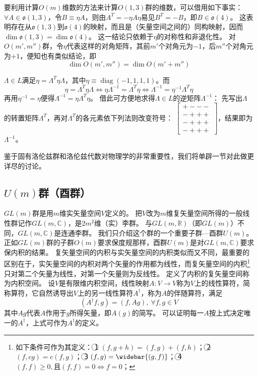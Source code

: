 要利用计算$O(m)$维数的方法来计算$O(1, 3)$群的维数，可以借用如下事实：
$\forall A \in \mathfrak{o}(1, 3)$，令$B \equiv \eta A$，则由$A^T = -\eta A \eta$易见$B^T = -B$，即$B \in \mathfrak{o}(4)$。
这表明存在从$\mathfrak{o}(1, 3)$到$\mathfrak{o}(4)$的映射，而且是（矢量空间之间的）同构映射，因而$\dim \mathfrak{o}(1, 3) = \dim \mathfrak{o}(4)$。
这一结论只依赖于$\eta$的对称性和非退化性。
对$O(m', m'')$群，令$\eta$代表这样的对角矩阵，其前$m'$个对角元为$-1$，后$m''$个对角元为$+1$，便知也有类似结论，即
$$\dim O(m', m'') = \dim O(m' + m'')$$

$\Lambda \in L$满足$\eta = \Lambda^T \eta \Lambda$，其中$\eta \equiv \operatorname{diag}(-1, 1, 1, 1)$。而
$$\eta = \Lambda^T \eta \Lambda \Leftrightarrow \eta \Lambda^{-1} = \Lambda^T \eta \Leftrightarrow \Lambda^{-1} = \eta^{-1}\Lambda^T\eta$$
再用$\eta^{-1} = \eta$便得$\Lambda^{-1} = \eta \Lambda^T \eta$。
借此可方便地求得$\Lambda \in L$的逆矩阵$\Lambda^{-1}$：
先写出$\Lambda$的转置矩阵$\Lambda^T$，再对$\Lambda^T$的各元素依下列法则改变符号：
$\begin{bmatrix}
    + - - - \\
    - + + + \\
    - + + + \\
    - + + +
\end{bmatrix}$，结果即为$\Lambda^{-1}$。

鉴于固有洛伦兹群和洛伦兹代数对物理学的非常重要性，我们将单辟一节对此做更详尽的讨论。

\subsection{$U(m)$群（酉群）}

$GL(m)$群是用$m$维实矢量空间$V$定义的。
把$V$改为$m$维复矢量空间所得的一般线性群记作$GL(m, \mathbb{C})$，是$2m^2$维（实）李群。
与$GL(m, \mathbb{R})$（即$GL(m)$）不同，$GL(m, \mathbb{C})$是连通李群。
我们只介绍这个群的一个重要子群---酉群$U(m)$。
正如$GL(m)$群的子群$O(m)$要求保度规那样，酉群$U(m)$是对$GL(m, \mathbb{C})$要求保内积的结果。
复矢量空间的内积与实矢量空间的内积类似而又不同，最重要的区别在于，实矢量空间的内积对两个矢量的作用都为线性，而复矢量空间的内积\footnote{
    如下条件可作为其定义：
    \textcircled{1} $(f, g + h) = (f, g) + (f, h)$；
    \textcircled{2} $(f, cg) = c(f, g)$；
    \textcircled{3} $(f, g) = \widebar{(g, f)}$；
    \textcircled{4} $(f, f) \geq 0, \text{且} (f, f) = 0 \Leftrightarrow f = 0$；
}只对第二个矢量为线性，对第一个矢量则为反线性。
定义了内积的复矢量空间称为内积空间。
设$V$是有限维内积空间，线性映射$A \colon V \to V$称为$V$上的线性算符，简称算符，它自然诱导出$V$上的另一线性算符$A^\dagger$，称为$A$的伴随算符，满足
$$(A^\dagger f, g) = (f, Ag), ~ \forall f, g \in V$$
其中$Ag$代表$A$作用于$g$所得矢量，即$A(g)$的简写。
可以证明每一$A$按上式决定唯一的$A^\dagger$，上式可作为$A^\dagger$的定义。


